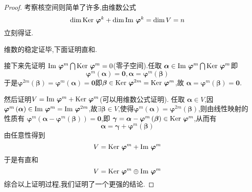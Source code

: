 {\begin{proof}
        考察核空间则简单了许多,由维数公式
        \[
            \dim \operatorname{Ker\,} \bm{\varphi}^k + \dim
            \operatorname{Im\,}\bm{\varphi}^k = \dim V =n
        \]
        立刻得证.

        维数的稳定证毕,下面证明直和.

        接下来先证明
        $\operatorname{Im\,}\bm{\varphi}^m
            \bigcap \operatorname{Ker\,} \bm{\varphi}^m = 0$(零子空间).任取
        $\bm{\alpha}\in \operatorname{Im\,}\bm{\varphi}^m\bigcap \operatorname{Ker\,} \bm{\varphi}^m$即
        \[
            \bm{\varphi}^m\left(\bm{\alpha}\right)=\bm{0},
            \bm{\alpha}=\bm{\varphi}^m\left(\bm{\beta}\right)
        \]
        于是$\bm{\varphi}^{2m}\left(\bm{\beta}\right)=
            \bm{\varphi}^m\left(\bm{\alpha}\right)=\bm{0}$即$\bm{\beta}\in
            \operatorname{Ker\,} \bm{\varphi}^{2m}=\operatorname{Ker\,} \bm{\varphi}^m$,故
        $\bm{\alpha}=\bm{\varphi}^m\left(\bm{\beta}\right)=\bm{0}$.

        然后证明$V=\operatorname{Im\,}\bm{\varphi}^m + \operatorname{Ker\,} \bm{\varphi}^m$(可以用维数公式证明).
        任取
        $\bm{\alpha}\in V$,因$\bm{\varphi}^m\left(
            \bm{\alpha}
            \right)\in \operatorname{Im\,}
            \bm{\varphi}^m=\operatorname{Im\,}
            \bm{\varphi}^{2m}$,故$\exists \bm{\beta}\in V$,使得$\bm{\varphi}^{m}\left(\bm{\alpha}
            \right)=\bm{\varphi}^{2m}\left(\bm{\beta}
            \right)$,则由线性映射的性质有
        $\bm{\varphi}^m\left(\bm{\alpha}-\bm{\varphi}^m\left(\bm{\beta}
                \right)\right)=\bm{0}$,即
        $\bm{\gamma}=\bm{\alpha}-\bm{\varphi}^m\left(\bm{\beta}\right)\in \operatorname{Ker\,} \bm{\varphi}^m$,从而有
        \[
            \bm{\alpha}=\bm{\gamma}+\bm{\varphi}^m\left(\bm{\beta}\right)
        \]
        由任意性得到
        \[
            V=\operatorname{Ker\,} \bm{\varphi}^m+\operatorname{Im\,}\bm{\varphi}^m
        \]
        于是有直和
        \[
            V=\operatorname{Ker\,} \bm{\varphi}^m\oplus\operatorname{Im\,}\bm{\varphi}^m
        \]
        综合以上证明过程,我们证明了一个更强的结论.
    \end{proof}
}
